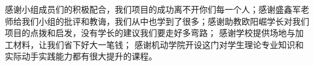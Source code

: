 

\begin{acknowledgements}



  感谢小组成员们的积极配合，我们项目的成功离不开你们每一个人；感谢盛鑫军老师给我们小组的批评和教诲，我们从中也学到了很多；感谢助教欧阳崛学长对我们项目的点拨和启发，没有学长的建议我们要走好多弯路；
  感谢学校提供场地与加工材料，让我们省下好大一笔钱；
  感谢机动学院开设这门对学生理论专业知识和实际动手实践能力都有很大提升的课程。

\end{acknowledgements}

